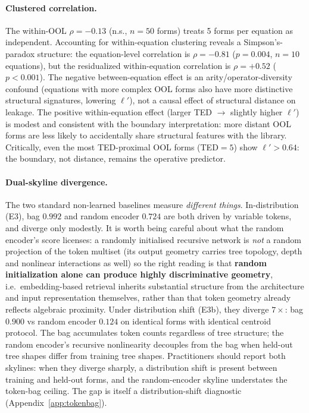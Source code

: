 \paragraph{Clustered correlation.} The within-OOL $\rho{=}{-}0.13$ (n.s., $n{=}50$ forms) treats 5 forms per equation as independent.  Accounting for within-equation clustering reveals a Simpson's-paradox structure: the equation-level correlation is $\rho{=}{-}0.81$ ($p{=}0.004$, $n{=}10$ equations), but the residualized within-equation correlation is $\rho{=}{+}0.52$ ($p{<}0.001$).  The negative between-equation effect is an arity/operator-diversity confound (equations with more complex OOL forms also have more distinctive structural signatures, lowering $\ell'$), not a causal effect of structural distance on leakage.  The positive within-equation effect (larger TED $\to$ slightly higher $\ell'$) is modest and consistent with the boundary interpretation: more distant OOL forms are less likely to accidentally share structural features with the library.  Critically, even the most TED-proximal OOL forms (TED$=5$) show $\ell' > 0.64$: the boundary, not distance, remains the operative predictor.

\paragraph{Dual-skyline divergence.} The two standard non-learned baselines measure \emph{different things}. In-distribution (E3), bag $0.992$ and random encoder $0.724$ are both driven by variable tokens, and diverge only modestly. It is worth being careful about what the random encoder's score licenses: a randomly initialised recursive network is \emph{not} a random projection of the token multiset (its output geometry carries tree topology, depth and nonlinear interactions as well) so the right reading is that \textbf{random initialization alone can produce highly discriminative geometry}, i.e.\ embedding-based retrieval inherits substantial structure from the architecture and input representation themselves, rather than that token geometry already reflects algebraic proximity. Under distribution shift (E3b), they diverge $7\times$: bag $0.900$ vs random encoder $0.124$ on identical forms with identical centroid protocol. The bag accumulates token counts regardless of tree structure; the random encoder's recursive nonlinearity decouples from the bag when held-out tree shapes differ from training tree shapes. Practitioners should report both skylines: when they diverge sharply, a distribution shift is present between training and held-out forms, and the random-encoder skyline understates the token-bag ceiling. The gap is itself a distribution-shift diagnostic (Appendix~\ref{app:tokenbag}).

